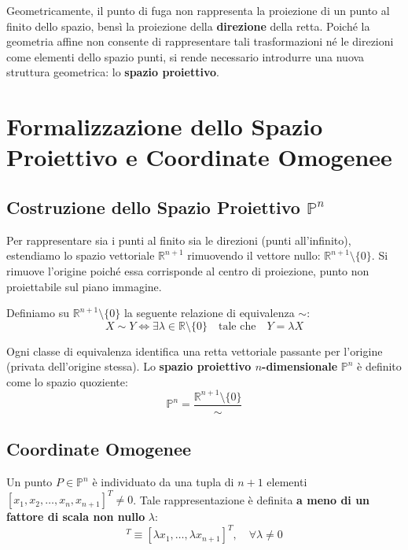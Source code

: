 Geometricamente, il punto di fuga non rappresenta la proiezione di un punto al finito dello spazio, bensì la proiezione della \textbf{direzione} della retta. Poiché la geometria affine non consente di rappresentare tali trasformazioni né le direzioni come elementi dello spazio punti, si rende necessario introdurre una nuova struttura geometrica: lo \textbf{spazio proiettivo}.

\section{Formalizzazione dello Spazio Proiettivo e Coordinate Omogenee}

\subsection{Costruzione dello Spazio Proiettivo $\mathbb{P}^n$}
Per rappresentare sia i punti al finito sia le direzioni (punti all'infinito), estendiamo lo spazio vettoriale $\mathbb{R}^{n+1}$ rimuovendo il vettore nullo: $\mathbb{R}^{n+1} \setminus \{0\}$. Si rimuove l'origine poiché essa corrisponde al centro di proiezione, punto non proiettabile sul piano immagine.

Definiamo su $\mathbb{R}^{n+1} \setminus \{0\}$ la seguente relazione di equivalenza $\sim$:
\begin{equation}
    X \sim Y \iff \exists \lambda \in \mathbb{R} \setminus \{0\} \quad \text{tale che} \quad Y = \lambda X
\end{equation}

Ogni classe di equivalenza identifica una retta vettoriale passante per l'origine (privata dell'origine stessa). Lo \textbf{spazio proiettivo $n$-dimensionale} $\mathbb{P}^n$ è definito come lo spazio quoziente:
\begin{equation}
    \mathbb{P}^n = \frac{\mathbb{R}^{n+1} \setminus \{0\}}{\sim}
\end{equation}

\subsection{Coordinate Omogenee}
Un punto $P \in \mathbb{P}^n$ è individuato da una tupla di $n+1$ elementi $[x_1, x_2, \dots, x_n, x_{n+1}]^T \neq 0$. Tale rappresentazione è definita \textbf{a meno di un fattore di scala non nullo} $\lambda$:
\begin{equation}
    [x_1, \dots, x_{n+1}]^T \equiv [\lambda x_1, \dots, \lambda x_{n+1}]^T, \quad \forall \lambda \neq 0
\end{equation}


